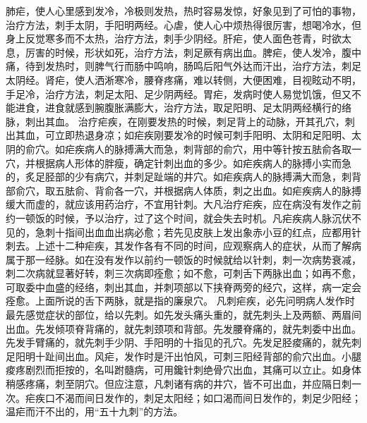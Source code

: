 \documentclass[a4paper,12pt,UTF8,twoside]{ctexbook}
\begin{document}
肺疟，使人心里感到发冷，冷极则发热，热时容易发惊，好象见到了可怕的事物，治疗方法，刺手太阴，手阳明两经。心虐，使人心中烦热得很厉害，想喝冷水，但身上反觉寒多而不太热，治疗方法，刺手少阴经。肝疟，使人面色苍青，时欲太息，厉害的时候，形状如死，治疗方法，刺足厥有病出血。脾疟，使人发冷，腹中痛，待到发热时，则脾气行而肠中鸣响，肠鸣后阳气外达而汗出，治疗方法，刺足太阴经。肾疟，使人洒淅寒冷，腰脊疼痛，难以转侧，大便困难，目视眩动不明，手足冷，治疗方法，刺足太阳、足少阴两经。胃疟，发病时使人易觉饥饿，但又不能进食，进食就感到腕腹胀满膨大，治疗方法，取足阳明、足太阴两经横行的络脉，刺出其血。
治疗疟疾，在刚要发热的时候，刺足背上的动脉，开其孔穴，刺出其血，可立即热退身凉；如疟疾刚要发冷的时候可刺手阳明、太阴和足阳明、太阴的俞穴。如疟疾病人的脉搏满大而急，刺背部的俞穴，用中等针按五胠俞各取一穴，并根据病人形体的胖瘦，确定针刺出血的多少。如疟疾病人的脉搏小实而急的，炙足胫部的少有病穴，并刺足趾端的井穴。如疟疾病人的脉搏满大而急，刺背部俞穴，取五胠俞、背俞各一穴，并根据病人体质，刺之出血。如疟疾病人的脉搏缓大而虚的，就应该用药治疗，不宜用针刺。大凡治疗疟疾，应在病没有发作之前约一顿饭的时候，予以治疗，过了这个时间，就会失去时机。凡疟疾病人脉沉伏不见的，急刺十指间出血血出病必愈；若先见皮肤上发出象赤小豆的红点，应都用针刺去。上述十二种疟疾，其发作各有不同的时间，应观察病人的症状，从而了解病属于那一经脉。如在没有发作以前约一顿饭的时候就给以针刺，刺一次病势衰减，刺二次病就显著好转，刺三次病即痊愈；如不愈，可刺舌下两脉出血；如再不愈，可取委中血盛的经络，刺出其血，并刺项部以下挟脊两旁的经穴，这样，病一定会痊愈。上面所说的舌下两脉，就是指的廉泉穴。
凡刺疟疾，必先问明病人发作时最先感觉症状的部位，给以先刺。如先发头痛头重的，就先刺头上及两额、两眉间出血。先发倾项脊背痛的，就先刺颈项和背部。先发腰脊痛的，就先刺委中出血。先发手臂痛的，就先刺手少阴、手阳明的十指见的孔穴。先发足胫痠痛的，就先刺足阳明十趾间出血。风疟，发作时是汗出怕风，可刺三阳经背部的俞穴出血。小腿痠疼剧烈而拒按的，名叫跗髓病，可用鑱针刺绝骨穴出血，其痛可以立止。如身体稍感疼痛，刺至阴穴。但应注意，凡刺诸有病的井穴，皆不可出血，并应隔日刺一次。疟疾口不渴而间日发作的，刺足太阳经；如口渴而间日发作的，刺足少阳经；温疟而汗不出的，用“五十九刺”的方法。
\end{document}
